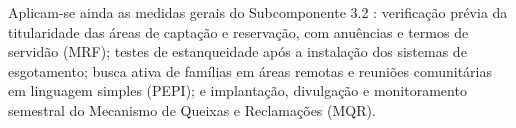 Aplicam-se ainda as medidas gerais do Subcomponente 3.2 \cite[Quadro 25]{mop2026}:
verificação prévia da titularidade das áreas de captação e reservação, com
anuências e termos de servidão (MRF); testes de estanqueidade após a
instalação dos sistemas de esgotamento; busca ativa de famílias em áreas
remotas e reuniões comunitárias em linguagem simples (PEPI); e implantação,
divulgação e monitoramento semestral do Mecanismo de Queixas e Reclamações
(MQR).

